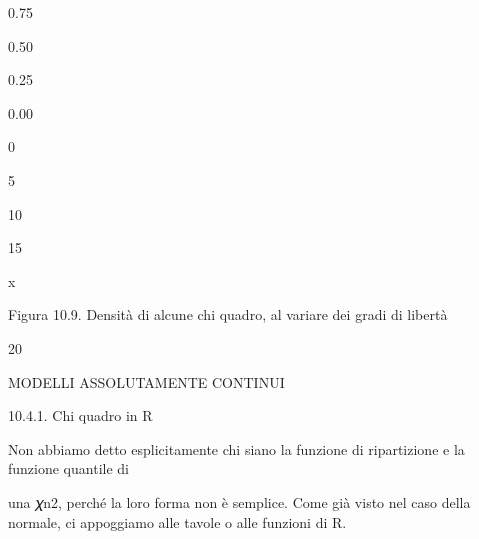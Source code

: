 \documentclass[a4paper,portrait,12pt]{article}
\begin{document}
0.75





0.50





0.25





0.00


0





5





10





15





\begin{flushleft}
x
\end{flushleft}


\begin{flushleft}
Figura 10.9. Densit\`{a} di alcune chi quadro, al variare dei gradi di libert\`{a}
\end{flushleft}





20










\begin{flushleft}
MODELLI ASSOLUTAMENTE CONTINUI
\end{flushleft}





\begin{flushleft}
10.4.1. Chi quadro in R
\end{flushleft}


\begin{flushleft}
Non abbiamo detto esplicitamente chi siano la funzione di ripartizione e la funzione quantile di
\end{flushleft}


\begin{flushleft}
una 𝜒n2, perch\'{e} la loro forma non \`{e} semplice. Come gi\`{a} visto nel caso della normale, ci appoggiamo alle tavole o alle funzioni di R.
\end{flushleft}
\end{document}
